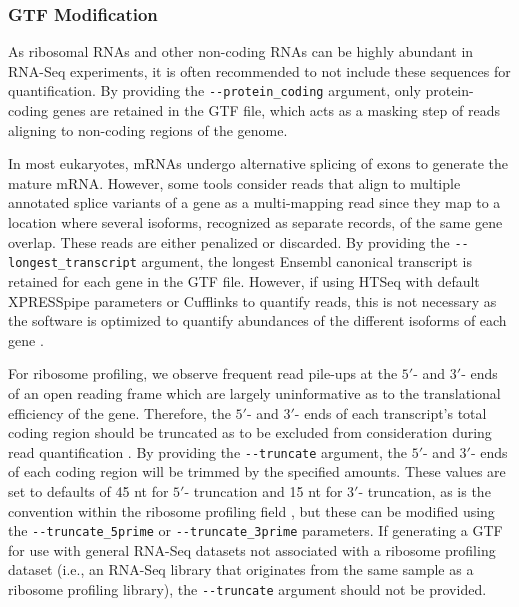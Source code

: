 \documentclass[10pt, oneside]{article}
\begin{document}
\subsubsection{GTF Modification}
As ribosomal RNAs and other non-coding RNAs can be highly abundant in RNA-Seq experiments, it is often recommended to not include these sequences for quantification. By providing the \texttt{-{}-protein\_coding} argument, only protein-coding genes are retained in the GTF file, which acts as a masking step of reads aligning to non-coding regions of the genome. \par

In most eukaryotes, mRNAs undergo alternative splicing of exons to generate the mature mRNA. However, some tools consider reads that align to multiple annotated splice variants of a gene as a multi-mapping read since they map to a location where several isoforms, recognized as separate records, of the same gene overlap. These reads are either penalized or discarded. By providing the \texttt{-{}-longest\_transcript} argument, the longest Ensembl canonical transcript \cite{ensembl_canon} is retained for each gene in the GTF file. However, if using HTSeq with default XPRESSpipe parameters or Cufflinks to quantify reads, this is not necessary as the software is optimized to quantify abundances of the different isoforms of each gene \cite{cufflinks}. \par

For ribosome profiling, we observe frequent read pile-ups at the $5'$- and $3'$- ends of an open reading frame which are largely uninformative as to the translational efficiency of the gene. Therefore, the $5'$- and $3'$- ends of each transcript's total coding region should be truncated as to be excluded from consideration during read quantification \cite{ingolia_meth, weinberg_reports}. By providing the \texttt{-{}-truncate} argument, the $5'$- and $3'$- ends of each coding region will be trimmed by the specified amounts. These values are set to defaults of 45 nt for $5'$- truncation and 15 nt for $3'$- truncation, as is the convention within the ribosome profiling field \cite{ingolia_meth}, but these can be modified using the \texttt{-{}-truncate\_5prime} or \texttt{-{}-truncate\_3prime} parameters. If generating a GTF for use with general RNA-Seq datasets not associated with a ribosome profiling dataset (i.e., an RNA-Seq library that originates from the same sample as a ribosome profiling library), the \texttt{-{}-truncate} argument should not be provided.
\end{document}
